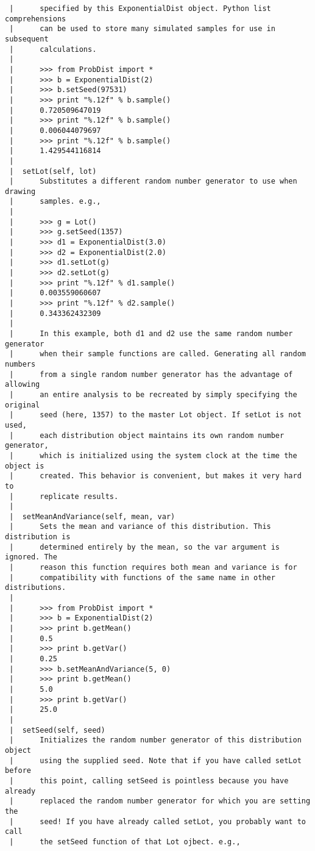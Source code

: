 \documentclass[10pt]{article}
\begin{document}
{\begin{verbatim}
 |      specified by this ExponentialDist object. Python list comprehensions
 |      can be used to store many simulated samples for use in subsequent
 |      calculations.
 |
 |      >>> from ProbDist import *
 |      >>> b = ExponentialDist(2)
 |      >>> b.setSeed(97531)
 |      >>> print "%.12f" % b.sample()
 |      0.720509647019
 |      >>> print "%.12f" % b.sample()
 |      0.006044079697
 |      >>> print "%.12f" % b.sample()
 |      1.429544116814
 |
 |  setLot(self, lot)
 |      Substitutes a different random number generator to use when drawing
 |      samples. e.g.,
 |
 |      >>> g = Lot()
 |      >>> g.setSeed(1357)
 |      >>> d1 = ExponentialDist(3.0)
 |      >>> d2 = ExponentialDist(2.0)
 |      >>> d1.setLot(g)
 |      >>> d2.setLot(g)
 |      >>> print "%.12f" % d1.sample()
 |      0.003559060607
 |      >>> print "%.12f" % d2.sample()
 |      0.343362432309
 |
 |      In this example, both d1 and d2 use the same random number generator
 |      when their sample functions are called. Generating all random numbers
 |      from a single random number generator has the advantage of allowing
 |      an entire analysis to be recreated by simply specifying the original
 |      seed (here, 1357) to the master Lot object. If setLot is not used,
 |      each distribution object maintains its own random number generator,
 |      which is initialized using the system clock at the time the object is
 |      created. This behavior is convenient, but makes it very hard to
 |      replicate results.
 |
 |  setMeanAndVariance(self, mean, var)
 |      Sets the mean and variance of this distribution. This distribution is
 |      determined entirely by the mean, so the var argument is ignored. The
 |      reason this function requires both mean and variance is for
 |      compatibility with functions of the same name in other distributions.
 |
 |      >>> from ProbDist import *
 |      >>> b = ExponentialDist(2)
 |      >>> print b.getMean()
 |      0.5
 |      >>> print b.getVar()
 |      0.25
 |      >>> b.setMeanAndVariance(5, 0)
 |      >>> print b.getMean()
 |      5.0
 |      >>> print b.getVar()
 |      25.0
 |
 |  setSeed(self, seed)
 |      Initializes the random number generator of this distribution object
 |      using the supplied seed. Note that if you have called setLot before
 |      this point, calling setSeed is pointless because you have already
 |      replaced the random number generator for which you are setting the
 |      seed! If you have already called setLot, you probably want to call
 |      the setSeed function of that Lot ojbect. e.g.,

\end{verbatim}}
\end{document}
